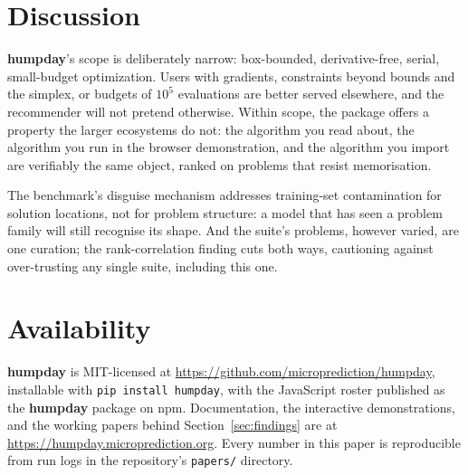 \documentclass[article]{jss}
\providecommand{\proglang}[1]{\textsf{#1}}
\providecommand{\pkg}[1]{\textbf{#1}}
\providecommand{\code}[1]{\texttt{#1}}
\begin{document}
\section{Discussion} \label{sec:discussion}

\pkg{humpday}'s scope is deliberately narrow: box-bounded, derivative-free,
serial, small-budget optimization. Users with gradients, constraints beyond
bounds and the simplex, or budgets of $10^5$ evaluations are better served
elsewhere, and the recommender will not pretend otherwise. Within scope, the
package offers a property the larger ecosystems do not: the algorithm you
read about, the algorithm you run in the browser demonstration, and the
algorithm you import are verifiably the same object, ranked on problems
that resist memorisation.

The benchmark's disguise mechanism addresses training-set contamination for
solution locations, not for problem structure: a model that has seen a
problem family will still recognise its shape. And the suite's problems,
however varied, are one curation; the rank-correlation finding cuts both
ways, cautioning against over-trusting any single suite, including this
one.

\section{Availability} \label{sec:availability}

\pkg{humpday} is MIT-licensed at
\url{https://github.com/microprediction/humpday}, installable with
\code{pip install humpday}, with the \proglang{JavaScript} roster published
as the \pkg{humpday} package on npm. Documentation, the interactive
demonstrations, and the working papers behind Section~\ref{sec:findings}
are at \url{https://humpday.microprediction.org}. Every number in this
paper is reproducible from run logs in the repository's \code{papers/}
directory.



\end{document}
